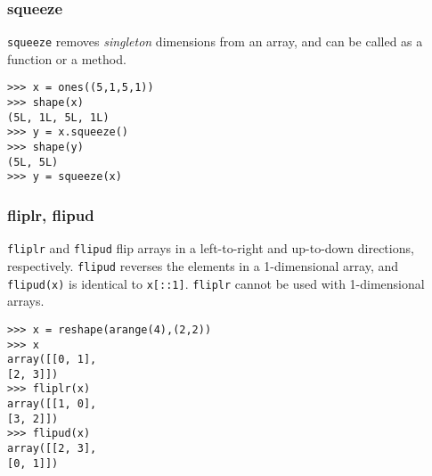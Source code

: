 \documentclass[KSmain.tex]{subfiles}
\begin{document}
\subsubsection{squeeze}
\texttt{squeeze} removes \textit{singleton} dimensions from an array, and can be called as a function or a method.
\begin{framed}
\begin{verbatim}
>>> x = ones((5,1,5,1))
>>> shape(x)
(5L, 1L, 5L, 1L)
>>> y = x.squeeze()
>>> shape(y)
(5L, 5L)
>>> y = squeeze(x)
\end{verbatim}
\end{framed}
\subsubsection{fliplr, flipud}
\texttt{fliplr} and \texttt{flipud} flip arrays in a left-to-right and up-to-down directions, respectively. \texttt{flipud} reverses
the elements in a 1-dimensional array, and \texttt{flipud(x)} is identical to \texttt{x[::1]}.
\texttt{fliplr} cannot be used with 1-dimensional arrays.
\begin{framed}
\begin{verbatim}
>>> x = reshape(arange(4),(2,2))
>>> x
array([[0, 1],
[2, 3]])
>>> fliplr(x)
array([[1, 0],
[3, 2]])
>>> flipud(x)
array([[2, 3],
[0, 1]])
\end{verbatim}
\end{framed}
\end{document}
